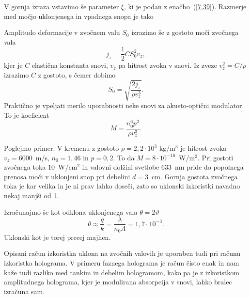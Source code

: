 V gornja izraza vstavimo še parameter $\xi$, ki je podan z enačbo~(\ref{7.39}).
Razmerje med močjo uklonjenega in vpadnega snopa je tako

Amplitudo deformacije v zvočnem valu $S_0$ izrazimo še z gostoto moči zvočnega vala 
\begin{equation}
j_{z}=\frac{1}{2}CS_{0}^{2}v_{z},
\label{7.49}
\end{equation}
kjer je $C$ elastična konstanta snovi, $v_z$ pa hitrost zvoka v snovi. 
Iz zveze $v_{z}^{2}=C/\rho$ izrazimo $C$ z gostoto, s čemer dobimo 
\begin{equation}
S_{0}=\sqrt{\frac{2j_{z}}{\rho v_{z}^{3}}}.
\label{7.50}
\end{equation}
Praktično je vpeljati merilo uporabnosti neke snovi za akusto-optični modulator. To je koeficient 
\begin{equation}
M=\frac{n_{0}^{6}p^{2}}{\rho v_{z}^{3}}.
\label{7.51}
\end{equation}

Poglejmo primer. V kremenu z gostoto $\rho=2,2\cdot10^{3}$ kg/m$^{3}$ je hitrost zvoka $v_{z}=6000$~m/s,
$n_{0}=1,46$ in $p=0,2$. To da $M=8\cdot10^{-16}$~W/m$^{2}$.
Pri gostoti zvočnega toka 10~W/cm$^{2}$ in valovni dolžini svetlobe 633~nm
pride do popolnega prenosa moči v uklonjeni snop pri debelini $d=3$~cm. Gornja gostota
zvočnega toka je kar velika in je ni prav lahko doseči, zato so 
uklonski izkoristki navadno nekaj manjši od 1.

Izračunajmo še kot odklona uklonjenega vala $\theta = 2 \vartheta$  
\begin{equation}
\theta \approx \frac{q}{k}=\frac{\lambda}{n_{0}\Lambda}=1,7\cdot10^{-3}
.\label{7.52}
\end{equation}
Uklonski kot je torej precej majhen.

\begin{remark}
Opisani račun izkoristka uklona na zvočnih valovih je uporaben tudi
pri računu izkoristka holograma. V primeru faznega holograma je račun
čisto enak in nam kaže tudi razliko med tankim in debelim hologramom,
kako pa je z izkoristkom amplitudnega holograma, kjer je modulirana
absorpcija v snovi, lahko bralec izračuna sam.
\end{remark}

